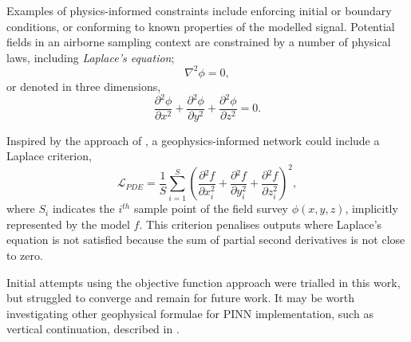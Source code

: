Examples of physics-informed constraints include enforcing initial or boundary conditions, or conforming to known properties of the modelled signal.
Potential fields in an airborne sampling context are constrained by a number of physical laws, including \emph{Laplace's equation};
\[
    \nabla^2 \phi = 0,
\]
or denoted in three dimensions,
\begin{equation}
    \label{eqn:Laplace}
    \frac{\partial{}^2\phi}{\partial{}x^2} + \frac{\partial{}^2\phi}{\partial{}y^2} + \frac{\partial{}^2\phi}{\partial{}z^2} = 0.
\end{equation}

Inspired by the approach of \textcite{raissiPhysicsinformedNeuralNetworks2019}, a geophysics-informed network could include a Laplace criterion,
\begin{equation}
    \label{eqn:crilaplace}
    \mathcal{L}_{PDE} = \frac{1}{S}\sum_{i=1}^{S} \left(\frac{\partial{}^2f}{\partial{}x_{i}^2} + \frac{\partial{}^2f}{\partial{}y_{i}^2} + \frac{\partial{}^2f}{\partial{}z_{i}^2}\right)^2,
\end{equation}
where \(S_i\) indicates the \(i^{th}\) sample point of the field survey \(\phi(x, y, z)\), implicitly represented by the model \(f\).
This criterion penalises outputs where Laplace's equation is not satisfied because the sum of partial second derivatives is not close to zero.


Initial attempts using the objective function approach were trialled in this work, but struggled to converge and remain for future work.
It may be worth investigating other geophysical formulae for PINN implementation, such as vertical continuation, described in \textcite{blakelyPotentialTheoryGravity1996}.

